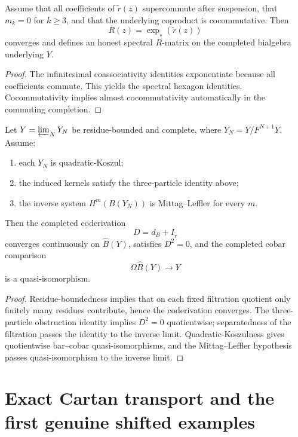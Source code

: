 \begin{theorem}
\ClaimStatusProvedHere
\label{thm:abelian-strictification}
Assume that all coefficients of $\widetilde r(z)$ supercommute after
suspension, that $m_k=0$ for $k\ge 3$, and that the underlying
coproduct is cocommutative.  Then
\[
R(z)=\exp_\star(\widetilde r(z))
\]
converges and defines an honest spectral $R$-matrix on the completed
bialgebra underlying $Y$.
\end{theorem}

\begin{proof}
The infinitesimal coassociativity identities exponentiate because all
coefficients commute.  This yields the spectral hexagon identities.
Cocommutativity implies almost cocommutativity automatically in the
commuting completion.
\end{proof}

\begin{theorem}
\ClaimStatusProvedHere
\label{thm:residue-bounded-completion}
Let $Y=\varprojlim_N Y_N$ be residue-bounded and complete, where
$Y_N=Y/F^{N+1}Y$.  Assume:
\begin{enumerate}
\item each $Y_N$ is quadratic-Koszul;
\item the induced kernels satisfy the three-particle identity above;
\item the inverse system $H^m(B(Y_N))$ is Mittag--Leffler for every $m$.
\end{enumerate}
Then the completed coderivation
\[
D=d_B+I_{\widetilde r}
\]
converges continuously on $\widehat B(Y)$, satisfies $D^2=0$, and the
completed cobar comparison
\[
\Omega\widehat B(Y)\longrightarrow Y
\]
is a quasi-isomorphism.
\end{theorem}

\begin{proof}
Residue-boundedness implies that on each fixed filtration quotient only
finitely many residues contribute, hence the coderivation converges.
The three-particle obstruction identity implies $D^2=0$ quotientwise;
separatedness of the filtration passes the identity to the inverse
limit.  Quadratic-Koszulness gives quotientwise bar--cobar
quasi-isomorphisms, and the Mittag--Leffler hypothesis passes
quasi-isomorphism to the inverse limit.
\end{proof}

\section{Exact Cartan transport and the first genuine shifted examples}

